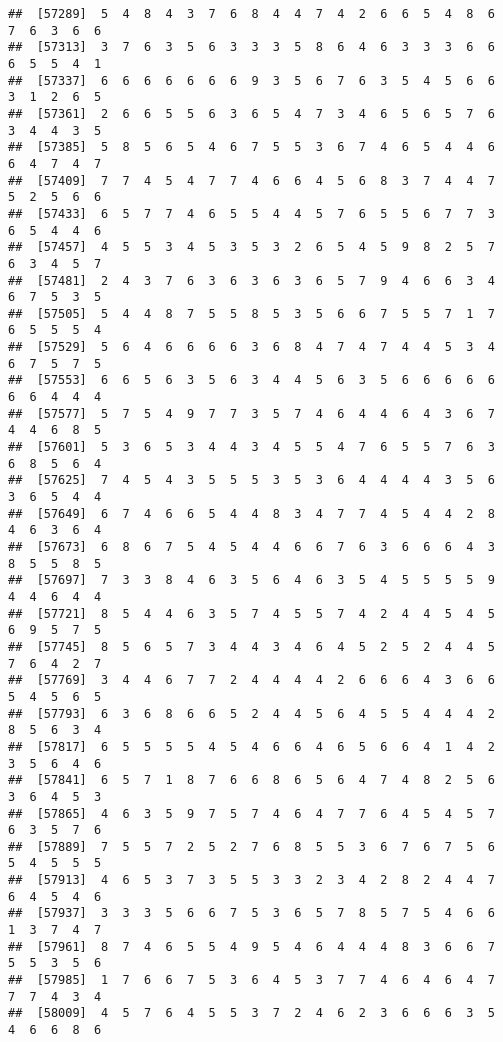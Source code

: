 \documentclass[
]{book}
\begin{document}
\begin{verbatim}
##  [57289]  5  4  8  4  3  7  6  8  4  4  7  4  2  6  6  5  4  8  6  7  6  3  6  6
##  [57313]  3  7  6  3  5  6  3  3  3  5  8  6  4  6  3  3  3  6  6  6  5  5  4  1
##  [57337]  6  6  6  6  6  6  6  9  3  5  6  7  6  3  5  4  5  6  6  3  1  2  6  5
##  [57361]  2  6  6  5  5  6  3  6  5  4  7  3  4  6  5  6  5  7  6  3  4  4  3  5
##  [57385]  5  8  5  6  5  4  6  7  5  5  3  6  7  4  6  5  4  4  6  6  4  7  4  7
##  [57409]  7  7  4  5  4  7  7  4  6  6  4  5  6  8  3  7  4  4  7  5  2  5  6  6
##  [57433]  6  5  7  7  4  6  5  5  4  4  5  7  6  5  5  6  7  7  3  6  5  4  4  6
##  [57457]  4  5  5  3  4  5  3  5  3  2  6  5  4  5  9  8  2  5  7  6  3  4  5  7
##  [57481]  2  4  3  7  6  3  6  3  6  3  6  5  7  9  4  6  6  3  4  6  7  5  3  5
##  [57505]  5  4  4  8  7  5  5  8  5  3  5  6  6  7  5  5  7  1  7  6  5  5  5  4
##  [57529]  5  6  4  6  6  6  6  3  6  8  4  7  4  7  4  4  5  3  4  6  7  5  7  5
##  [57553]  6  6  5  6  3  5  6  3  4  4  5  6  3  5  6  6  6  6  6  6  6  4  4  4
##  [57577]  5  7  5  4  9  7  7  3  5  7  4  6  4  4  6  4  3  6  7  4  4  6  8  5
##  [57601]  5  3  6  5  3  4  4  3  4  5  5  4  7  6  5  5  7  6  3  6  8  5  6  4
##  [57625]  7  4  5  4  3  5  5  5  3  5  3  6  4  4  4  4  3  5  6  3  6  5  4  4
##  [57649]  6  7  4  6  6  5  4  4  8  3  4  7  7  4  5  4  4  2  8  4  6  3  6  4
##  [57673]  6  8  6  7  5  4  5  4  4  6  6  7  6  3  6  6  6  4  3  8  5  5  8  5
##  [57697]  7  3  3  8  4  6  3  5  6  4  6  3  5  4  5  5  5  5  9  4  4  6  4  4
##  [57721]  8  5  4  4  6  3  5  7  4  5  5  7  4  2  4  4  5  4  5  6  9  5  7  5
##  [57745]  8  5  6  5  7  3  4  4  3  4  6  4  5  2  5  2  4  4  5  7  6  4  2  7
##  [57769]  3  4  4  6  7  7  2  4  4  4  4  2  6  6  6  4  3  6  6  5  4  5  6  5
##  [57793]  6  3  6  8  6  6  5  2  4  4  5  6  4  5  5  4  4  4  2  8  5  6  3  4
##  [57817]  6  5  5  5  5  4  5  4  6  6  4  6  5  6  6  4  1  4  2  3  5  6  4  6
##  [57841]  6  5  7  1  8  7  6  6  8  6  5  6  4  7  4  8  2  5  6  3  6  4  5  3
##  [57865]  4  6  3  5  9  7  5  7  4  6  4  7  7  6  4  5  4  5  7  6  3  5  7  6
##  [57889]  7  5  5  7  2  5  2  7  6  8  5  5  3  6  7  6  7  5  6  5  4  5  5  5
##  [57913]  4  6  5  3  7  3  5  5  3  3  2  3  4  2  8  2  4  4  7  6  4  5  4  6
##  [57937]  3  3  3  5  6  6  7  5  3  6  5  7  8  5  7  5  4  6  6  1  3  7  4  7
##  [57961]  8  7  4  6  5  5  4  9  5  4  6  4  4  4  8  3  6  6  7  5  5  3  5  6
##  [57985]  1  7  6  6  7  5  3  6  4  5  3  7  7  4  6  4  6  4  7  7  7  4  3  4
##  [58009]  4  5  7  6  4  5  5  3  7  2  4  6  2  3  6  6  6  3  5  4  6  6  8  6

\end{verbatim}
\end{document}
